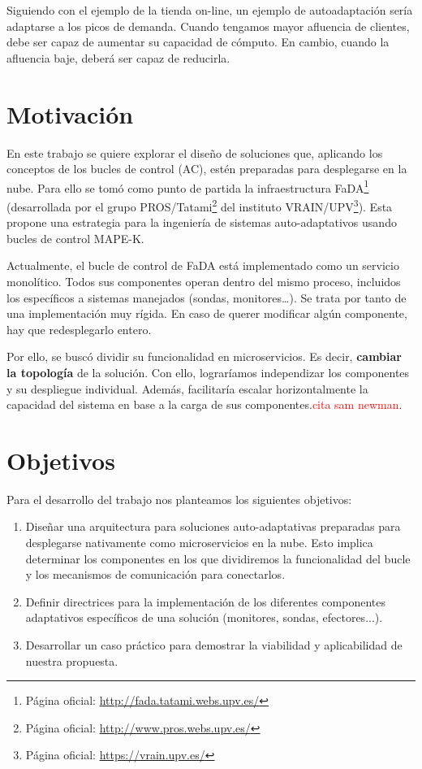 Siguiendo con el ejemplo de la tienda on-line, un ejemplo de autoadaptación sería adaptarse a los picos de demanda. Cuando tengamos mayor afluencia de clientes, debe ser capaz de aumentar su capacidad de cómputo. En cambio, cuando la afluencia baje, deberá ser capaz de reducirla.

\section{Motivación}

En este trabajo se quiere explorar el diseño de soluciones que, aplicando los conceptos de los bucles de control (AC), estén preparadas para desplegarse en la nube. Para ello se tomó como punto de partida la infraestructura FaDA\footnote{Página oficial: \url{http://fada.tatami.webs.upv.es/}} (desarrollada por el grupo PROS/Tatami\footnote{Página oficial: \url{http://www.pros.webs.upv.es/}} del instituto VRAIN/UPV\footnote{Página oficial: \url{https://vrain.upv.es/}}). Esta propone una estrategia para la ingeniería de sistemas auto-adaptativos usando bucles de control MAPE-K\cite{ibmcorporationArchitecturalBlueprintAutonomic2006, fonsServiciosAdaptivereadyPara2021}.

Actualmente, el bucle de control de FaDA está implementado como un servicio monolítico. Todos sus componentes operan dentro del mismo proceso, incluidos los específicos a sistemas manejados (sondas, monitores\dots). Se trata por tanto de una implementación muy rígida. En caso de querer modificar algún componente, hay que redesplegarlo entero.

Por ello, se buscó dividir su funcionalidad en microservicios. Es decir, \textbf{cambiar la topología} de la solución. Con ello, lograríamos independizar los componentes y su despliegue individual. Además, facilitaría escalar horizontalmente la capacidad del sistema en base a la carga de sus componentes.\textcolor{red}{cita sam newman}.

\section{Objetivos}

Para el desarrollo del trabajo nos planteamos los siguientes objetivos:

\begin{enumerate}
  \item Diseñar una arquitectura para soluciones auto-adaptativas preparadas para desplegarse nativamente como microservicios en la nube. Esto implica determinar los componentes en los que dividiremos la funcionalidad del bucle y los mecanismos de comunicación para conectarlos.

  \item Definir directrices para la implementación de los diferentes componentes adaptativos específicos de una solución (monitores, sondas, efectores...).

  \item Desarrollar un caso práctico para demostrar la viabilidad y aplicabilidad de nuestra propuesta.
\end{enumerate}

